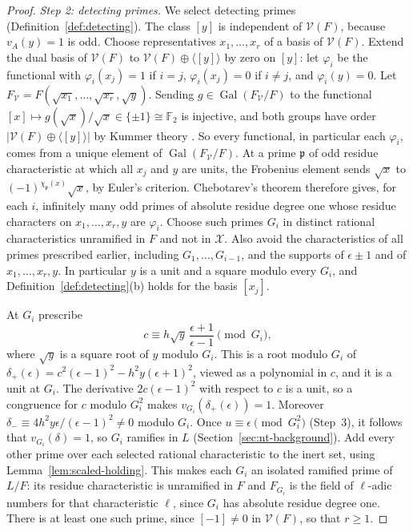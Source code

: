 \documentclass[11pt]{article}
\theoremstyle{plain}
\theoremstyle{definition}
\theoremstyle{remark}
\DeclareMathOperator{\Gal}{Gal}
\newcommand{\F}{\mathbb F}
\begin{document}
\begin{proof}
\emph{Step 2: detecting primes.}  We select detecting primes
(Definition~\ref{def:detecting}).  The class $[y]$ is independent of
$\mathcal V(F)$, because $v_A(y)=1$ is odd.  Choose representatives
$x_1,\dots,x_r$ of a basis of $\mathcal V(F)$.  Extend the dual basis of
$\mathcal V(F)$ to $\mathcal V(F)\oplus\langle[y]\rangle$ by zero on
$[y]$: let $\varphi_i$ be the functional with $\varphi_i(x_j)=1$ if $i=j$,
$\varphi_i(x_j)=0$ if $i\ne j$, and $\varphi_i(y)=0$.  Let
$F_{\mathcal V}=F(\sqrt{x_1},\dots,\sqrt{x_r},\sqrt y)$.  Sending $g\in\Gal(F_{\mathcal V}/F)$
to the functional $[x]\mapsto g(\sqrt x)/\sqrt x\in\{\pm1\}\cong\F_2$
is injective, and both groups have order
$|\mathcal V(F)\oplus\langle[y]\rangle|$ by Kummer theory
\cite[Chapter~VII, Appendix~A, Theorem~A.3]{MilneCFT}.  So every
functional, in particular each $\varphi_i$, comes from a unique element
of $\Gal(F_{\mathcal V}/F)$.  At a prime $\mathfrak p$ of odd
residue characteristic at which all $x_j$ and $y$ are units, the
Frobenius element sends $\sqrt x$ to $(-1)^{\chi_{\mathfrak p}(x)}\sqrt
x$, by Euler's criterion.  Chebotarev's theorem therefore gives, for each
$i$, infinitely many odd primes of absolute residue degree one whose
residue characters on $x_1,\dots,x_r,y$ are $\varphi_i$.  Choose such
primes $G_i$ in distinct rational characteristics unramified in $F$ and
not in $\mathcal X$.  Also avoid the characteristics of all primes
prescribed earlier, including $G_1,\dots,G_{i-1}$, and the supports of $\epsilon\pm1$ and of $x_1,\dots,x_r,y$.  In
particular $y$ is a unit and a square modulo every $G_i$, and
Definition~\ref{def:detecting}(b) holds for the basis $[x_j]$.

At $G_i$ prescribe
\[
 c\equiv h\sqrt y\,\frac{\epsilon+1}{\epsilon-1}\pmod{G_i},
\]
where $\sqrt y$ is a square root of $y$ modulo $G_i$.  This is a root
modulo $G_i$ of $\delta_+(\epsilon)=c^2(\epsilon-1)^2-h^2y(\epsilon+1)^2$,
viewed as a polynomial in $c$, and it is a unit at $G_i$.  The
derivative $2c(\epsilon-1)^2$ with respect to $c$ is a unit, so a
congruence for $c$ modulo $G_i^2$ makes $v_{G_i}(\delta_+(\epsilon))=1$.
Moreover $\delta_-\equiv4h^2y\epsilon/(\epsilon-1)^2\ne0$ modulo $G_i$.
Once $u\equiv\epsilon\pmod{G_i^2}$ (Step~3), it follows that
$v_{G_i}(\delta)=1$, so $G_i$ ramifies in $L$
(Section~\ref{sec:nt-background}).  Add every other prime over each
selected rational characteristic to the inert set, using
Lemma~\ref{lem:scaled-holding}.  This makes each $G_i$ an isolated
ramified prime of $L/F$: its residue characteristic is unramified in $F$
and $F_{G_i}$ is the field of $\ell$-adic numbers for that characteristic
$\ell$, since $G_i$ has absolute residue degree one.  There is at least
one such prime, since $[-1]\ne0$ in $\mathcal V(F)$, so that $r\ge1$.


\end{proof}
\end{document}
